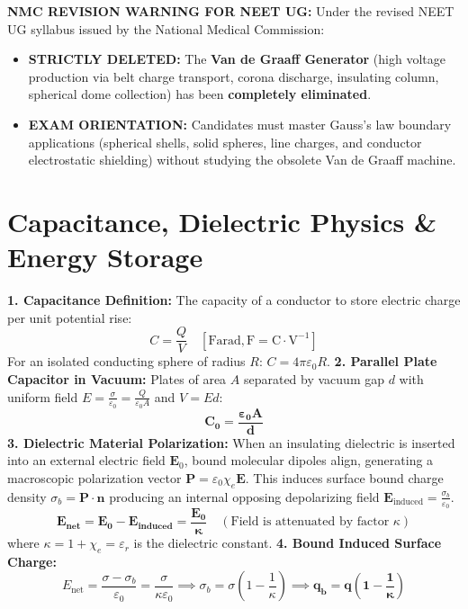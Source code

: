 \documentclass[10pt,twoside,openright]{book}
\begin{document}
\begin{trapbox}
\textbf{NMC REVISION WARNING FOR NEET UG:}
Under the revised NEET UG syllabus issued by the National Medical Commission:
\begin{itemize}
  \item \textbf{STRICTLY DELETED:} The \textbf{Van de Graaff Generator} (high voltage production via belt charge transport, corona discharge, insulating column, spherical dome collection) has been \textbf{completely eliminated}.
  \item \textbf{EXAM ORIENTATION:} Candidates must master Gauss's law boundary applications (spherical shells, solid spheres, line charges, and conductor electrostatic shielding) without studying the obsolete Van de Graaff machine.
\end{itemize}
\end{trapbox}

\section{Capacitance, Dielectric Physics \& Energy Storage}

\begin{conceptbox}
\textbf{1. Capacitance Definition:}
The capacity of a conductor to store electric charge per unit potential rise:
\begin{equation}
  C = \frac{Q}{V} \quad [\mathrm{Farad}, \mathrm{F} = \mathrm{C}\cdot\mathrm{V}^{-1}]
\end{equation}
For an isolated conducting sphere of radius $R$: $C = 4\pi\varepsilon_0 R$.
\textbf{2. Parallel Plate Capacitor in Vacuum:}
Plates of area $A$ separated by vacuum gap $d$ with uniform field $E = \frac{\sigma}{\varepsilon_0} = \frac{Q}{\varepsilon_0 A}$ and $V = Ed$:
\begin{equation}
  \mathbf{C_0 = \frac{\varepsilon_0 A}{d}}
\end{equation}
\textbf{3. Dielectric Material Polarization:}
When an insulating dielectric is inserted into an external electric field $\mathbf{E}_0$, bound molecular dipoles align, generating a macroscopic polarization vector $\mathbf{P} = \varepsilon_0 \chi_e \mathbf{E}$.
This induces surface bound charge density $\sigma_b = \mathbf{P}\cdot\hat{\mathbf{n}}$ producing an internal opposing depolarizing field $\mathbf{E}_{\text{induced}} = \frac{\sigma_b}{\varepsilon_0}$.
\begin{equation}
  \mathbf{E_{\text{net}} = \mathbf{E}_0 - \mathbf{E}_{\text{induced}} = \frac{\mathbf{E}_0}{\kappa}} \quad (\text{Field is attenuated by factor } \kappa)
\end{equation}
where $\kappa = 1 + \chi_e = \varepsilon_r$ is the dielectric constant.
\textbf{4. Bound Induced Surface Charge:}
\begin{equation}
  E_{\text{net}} = \frac{\sigma - \sigma_b}{\varepsilon_0} = \frac{\sigma}{\kappa\varepsilon_0} \implies \sigma_b = \sigma\left(1 - \frac{1}{\kappa}\right) \implies \mathbf{q_b = q\left(1 - \frac{1}{\kappa}\right)}
\end{equation}
\end{conceptbox}
\end{document}
